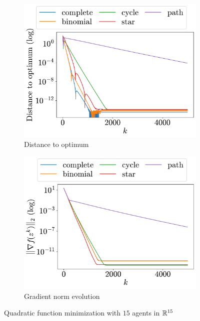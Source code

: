 \documentclass[a4paper,11pt,oneside]{book}
\begin{document}
\begin{figure}[H]
      \centering
      \begin{subfigure}[t]{0.46\linewidth}
            \centering
            \includegraphics[width=\linewidth]{./figs/quadratic/15_15/distance.pdf} 
            \caption{Distance to optimum}
      \end{subfigure}
      \hfill
      \begin{subfigure}[t]{0.46\linewidth}
            \centering
            \includegraphics[width=\linewidth]{./figs/quadratic/15_15/gradient.pdf} 
            \caption{Gradient norm evolution}
      \end{subfigure}
      \caption{Quadratic function minimization with $15$ agents in ${\mathbb{R}}^{15}$}
      \label{fig:quadratic_15_15}
\end{figure}
\end{document}

